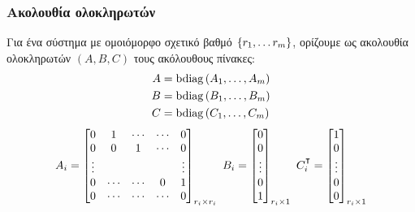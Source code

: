 \documentclass{beamer}
\DeclareMathOperator{\bdiag}{bdiag}
\newcommand\T{{\mathpalette\raiseT\intercal}}
\newcommand\raiseT[2]{\raisebox{0.45ex}{$#1#2$}}
\begin{document}
    \begin{frame}
        \frametitle{Ακολουθία ολοκληρωτών}
        Για ένα σύστημα με ομοιόμορφο σχετικό βαθμό $\qty{r_1, \ldots r_m}$, ορίζουμε ως ακολουθία ολοκληρωτών $(A,B,C)$ τους ακόλουθους πίνακες:
        \begin{align*}
            A &= \bdiag\pqty{A_1, \ldots, A_m}\\
            B &= \bdiag\pqty{B_1, \ldots, B_m}\\
            C &= \bdiag\pqty{C_1, \ldots, C_m}
        \end{align*}
        \[
            A_i = \begin{bmatrix}
                0 & 1 & \cdots & \cdots & 0 \\
                0 & 0 & 1 & \cdots & 0 \\
                \vdots & & & & \vdots \\
                0 & \cdots & \cdots & 0 & 1 \\
                0 & \cdots & \cdots & \cdots & 0
            \end{bmatrix}_{r_i \times r_i}\ 
            B_i = \bmqty{0\\ 0\\ \vdots\\ 0\\ 1}_{r_i \times 1}\ 
            C_i^\T = \begin{bmatrix}
                1 \\ 0 \\ \vdots \\ 0 \\ 0
            \end{bmatrix}_{r_i \times 1}
        \]
    \end{frame}
\end{document}
